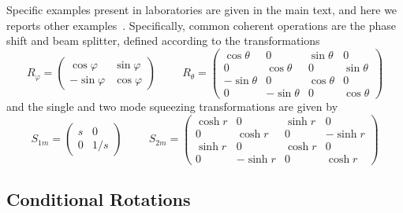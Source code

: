 \documentclass[%
reprint,
superscriptaddress,
nofootinbib,
 amsmath,amssymb,
prx,
floatfix,
]{revtex4-2}
\begin{document}
Specific examples present in laboratories are given in the main text, and here we reports other examples~\cite{serafini_quantum_2017}. Specifically, common coherent operations are the phase shift and beam splitter, defined according to the transformations
\begin{equation}
    R_{\varphi} = \begin{pmatrix} \cos\varphi & \sin\varphi \\ -\sin\varphi & \cos\varphi \end{pmatrix} \hspace{1cm}
    R_{\theta} = \begin{pmatrix} \cos\theta & 0 & \sin\theta & 0 \\ 0 & \cos\theta & 0 & \sin\theta \\ -\sin\theta & 0 & \cos\theta & 0 \\ 0 & -\sin\theta & 0 & \cos\theta \end{pmatrix}
\end{equation}
and the single and two mode squeezing transformations are given by 
\begin{equation}
    S_{1m} = \begin{pmatrix} s & 0 \\ 0 & 1/s \end{pmatrix} \hspace{1cm}
    S_{2m} = \begin{pmatrix} \cosh r & 0 & \sinh r & 0 \\ 0 & \cosh r & 0 & -\sinh r \\ \sinh r & 0 & \cosh r & 0 \\ 0 & -\sinh r & 0 & \cosh r \end{pmatrix}
\end{equation}


\subsection{Conditional Rotations}
\end{document}
